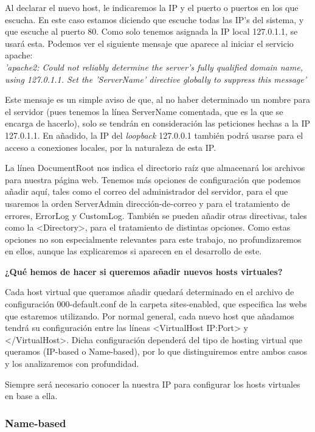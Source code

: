 \documentclass[a4paper, 10pt]{article} %
\begin{document}
Al declarar el nuevo host, le indicaremos la IP y el puerto o puertos en los que escucha. En este caso estamos diciendo que escuche todas las IP's del sistema, y que escuche al puerto 80. Como solo tenemos asignada la IP local 127.0.1.1, se usará esta. Podemos ver el siguiente mensaje que aparece al iniciar el servicio apache: \\
\textit{'apache2: Could not reliably determine the server's fully qualified domain name, using 127.0.1.1. Set the 'ServerName' directive globally to suppress this message'}

Este mensaje es un simple aviso de que, al no haber determinado un nombre para el servidor (pues tenemos la línea ServerName comentada, que es la que se encarga de hacerlo), solo se tendrán en consideración las peticiones hechas a la IP 127.0.1.1. En añadido, la IP del \textit{loopback} 127.0.0.1 también podrá usarse para el acceso a conexiones locales, por la naturaleza de esta IP. 

La línea DocumentRoot nos indica el directorio raíz que almacenará los archivos para nuestra página web. Tenemos más opciones de configuración que podemos añadir aquí, tales como el correo del administrador del servidor, para el que usaremos la orden ServerAdmin dirección-de-correo y para el tratamiento de errores, ErrorLog y CustomLog. También se pueden añadir otras directivas, tales como la <Directory>, para el tratamiento de distintas opciones. Como estas opciones no son especialmente relevantes para este trabajo, no profundizaremos en ellos, aunque las explicaremos si aparecen en el desarrollo de este. 

\textbf{¿Qué hemos de hacer si queremos añadir nuevos hosts virtuales?}



Cada host virtual que queramos añadir quedará determinado en el archivo de configuración 000-default.conf de la carpeta sites-enabled, que especifica las webs que estaremos utilizando. Por normal general, cada nuevo host que añadamos tendrá su configuración entre las líneas <VirtualHost IP:Port> y </VirtualHost>. Dicha configuración dependerá del tipo de hosting virtual que queramos (IP-based o Name-based), por lo que distinguiremos entre ambos casos y los analizaremos con profundidad. 

Siempre será necesario conocer la nuestra IP para configurar los hosts virtuales en base a ella. 

\subsubsection{Name-based}
\end{document}
